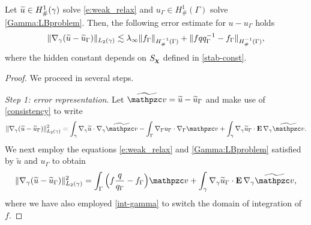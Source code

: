 \begin{lemma}\label{L:perturbation_bound}
Let $\widetilde{u}\in H^1_\#(\gamma)$ solve \eqref{e:weak_relax} and $u_\Gamma\in H^1_\#(\Gamma)$
solve \eqref{Gamma:LBproblem}. Then, the following error estimate for $u-u_\Gamma$ holds
%
\begin{equation}\label{perturbation_bound}
\|\nabla_\gamma(\widetilde{u}-\widetilde{u}_\Gamma)\|_{L_2(\gamma)} \lesssim \lambda_\infty \|f_\Gamma\|_{H^{-1}_\#(\Gamma)} + \| f q q_\Gamma^{-1} - f_\Gamma \|_{H^{-1}_\#(\Gamma)},
\end{equation}
%
where the hidden constant depends on $S_{\boldsymbol \chi}$ defined in \eqref{stab-const}.
\end{lemma}
%
\begin{proof}
We proceed in several steps.

\noindent
{\it Step 1: error representation}.
Let $\ttv = \wu-\wu_\Gamma$ and make use of \eqref{consistency} to write
%
\begin{equation*}
\|\nabla_\gamma ( \wu- \wu_\Gamma)\|_{L_2(\gamma)}^2
= \int_\gamma \nabla_\gamma  \wu \cdot \nabla_\gamma \ttv
-  \int_\Gamma \nabla_\Gamma u_\Gamma \cdot \nabla_\Gamma \tv
+ \int_\gamma \nabla_\gamma  \wu_\Gamma \cdot \bE \, \nabla_\gamma \ttv.
\end{equation*}
%
We next employ the equations 
\eqref{e:weak_relax} and \eqref{Gamma:LBproblem} satisfied by $\widetilde u$ and $u_\Gamma$
to obtain
%
\begin{equation*}
  \|\nabla_\gamma (\wu-\wu_\Gamma)\|_{L_2(\gamma)}^2  =
  \int_\Gamma \Big(f\frac{q}{q_\Gamma} - f_\Gamma \Big) \tv
+ \int_\gamma \nabla_\gamma \wu_\Gamma \cdot \bE \, \nabla_\gamma \wv,
\end{equation*}
%
where we have also employed \eqref{int-gamma} to switch the domain of integration
of $f$.


\end{proof}

